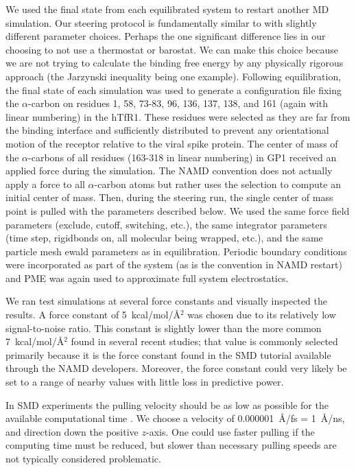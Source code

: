\documentclass[12pt]{article}
\begin{document}
We used the final state from each equilibrated system to restart another MD simulation. Our steering protocol is fundamentally similar to \citet{Cuendet2008} with slightly different parameter choices. Perhaps the one significant difference lies in our choosing to not use a thermostat or barostat. We can make this choice because we are not trying to calculate the binding free energy by any physically rigorous approach (the Jarzynski inequality being one example). Following equilibration, the final state of each simulation was used to generate a configuration file fixing the $\alpha$-carbon on residues 1, 58, 73-83, 96, 136, 137, 138, and 161 (again with linear numbering) in the hTfR1. These residues were selected as they are far from the binding interface and sufficiently distributed to prevent any orientational motion of the receptor relative to the viral spike protein. The center of mass of the $\alpha$-carbons of all residues (163-318 in linear numbering) in GP1 received an applied force during the simulation. The NAMD convention does not actually apply a force to all $\alpha$-carbon atoms but rather uses the selection to compute an initial center of mass. Then, during the steering run, the single center of mass point is pulled with the parameters described below. We used the same force field parameters (exclude, cutoff, switching, etc.), the same integrator parameters (time step, rigidbonds on, all molecular being wrapped, etc.), and the same particle mesh ewald parameters as in equilibration. Periodic boundary conditions were incorporated as part of the system (as is the convention in NAMD restart) and PME was again used to approximate full system electrostatics. 

We ran test simulations at several force constants and visually inspected the results. A force constant of 5~kcal/mol/\AA$^2$ was chosen due to its relatively low signal-to-noise ratio. This constant is slightly lower than the more common 7~kcal/mol/\AA$^2$ found in several recent studies; that value is commonly selected primarily because it is the force constant found in the SMD tutorial available through the NAMD  developers. Moreover, the force constant could very likely be set to a range of nearby values with little loss in predictive power.

In SMD experiments the pulling velocity should be as low as possible for the available computational time \citep{Cuendet2008,Cuendet2011}. We choose a velocity of 0.000001~\AA/fs = 1~\AA/ns, and direction down the positive $z$-axis. One could use faster pulling if the computing time must be reduced, but slower than necessary pulling speeds are not typically considered problematic. 
\end{document}
